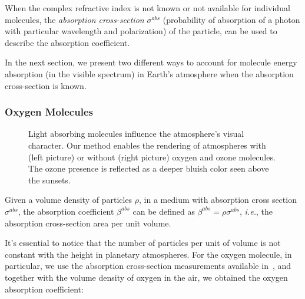 \documentclass[journal]{vgtc}                %
\newcommand{\review}[1]{{\color{blue}#1}}
\begin{document}
When the complex refractive index is not known or not available for individual molecules, the \textit{absorption cross-section} $\sigma^{abs}$ (probability of absorption of a photon with particular wavelength and polarization) of the particle, can be used to describe the absorption coefficient.

In the next section, we present two different ways to account for molecule energy absorption (in the visible spectrum) in Earth's atmosphere when the absorption cross-section is known.

\subsubsection{Oxygen Molecules}\label{section:oxygen}

\begin{figure}[t]
  \centering
  \vspace*{-5mm}
  \caption{Light absorbing molecules influence the atmosphere's visual character. \review{Our method enables the rendering of atmospheres with (left picture) or without (right picture) oxygen and ozone molecules. The ozone presence is reflected as a deeper bluish color seen above the sunsets.}} 
  \label{fig:ozone}
  \vspace*{-3.5mm}  
\end{figure}

Given a volume density of particles $\rho$, in a medium with absorption cross section $\sigma^{abs}$, the absorption coefficient $\beta^{abs}$ can be defined as $\beta^{abs} =\rho\sigma^{abs} $, \textit{i.e.}, the absorption cross-section area per unit volume.

It's essential to notice that the number of particles per unit of volume is not constant with the height in planetary atmospheres.  
For the \review{oxygen} molecule, in particular, we use the absorption \review{cross-section} measurements available in~\cite{Bogumil:2003}, and together with the volume density of oxygen in the air, we obtained the oxygen absorption coefficient:
\end{document}
